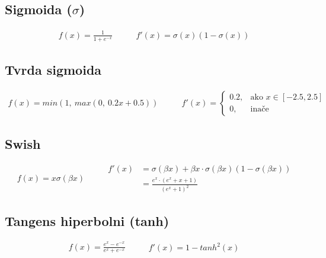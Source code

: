 \documentclass[times, utf8, diplomski]{fer}
\begin{document}
\subsection*{Sigmoida ($\sigma $)}

\begin{equation}
\begin{split}
f(x) = \frac{1}{1+e^{-x}}
\end{split}
\qquad
\begin{split}
f'(x) = \sigma(x)(1-\sigma(x))
\end{split}
\end{equation}

\subsection*{Tvrda sigmoida}

\begin{equation}
\begin{split}
f(x) = min(1,\ max(0,\ 0.2x + 0.5))
\end{split}
\qquad
\begin{split}
f'(x) = 
\begin{cases}
0.2,	 		& \text{ako } x \in [-2.5, 2.5] \\
0,	& \text{inače}
\end{cases}
\end{split}
\end{equation}

\subsection*{Swish}
\begin{equation}
\begin{split}
f(x) = x \sigma(\beta x)
\end{split}
\qquad
\begin{split}
f'(x) &= \sigma(\beta x) + \beta x \cdot \sigma(\beta x)(1-\sigma(\beta x)) \\
&= \frac{e^x \cdot (e^x + x + 1)}{(e^x + 1)^2}
\end{split}
\end{equation}

\subsection*{Tangens hiperbolni (tanh)}

\begin{equation}
\begin{split}
f(x) = \frac{e^x - e^{-x}}{e^x + e^{-x}}
\end{split}
\qquad
\begin{split}
f'(x) = 1 - tanh^2(x)
\end{split}
\end{equation}
\end{document}
